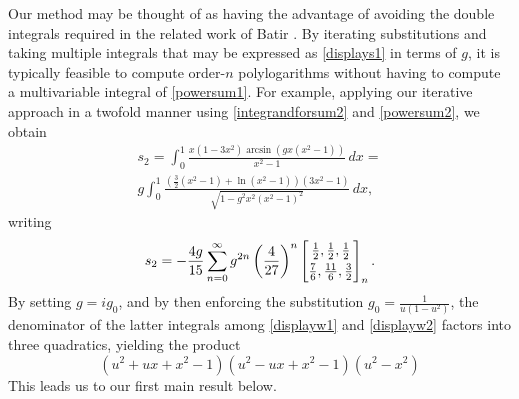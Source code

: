 \documentclass[12pt]{article}
\begin{document}
 Our method may be thought of as having the advantage of avoiding the double integrals required in the related work of Batir 
 \cite{Batir2005}. By iterating substitutions and taking multiple integrals that may be expressed as \eqref{displays1} in terms of 
 $g$, it is typically feasible to compute order-$n$ polylogarithms without having to compute a multivariable integral of 
 \eqref{powersum1}. For example, applying our iterative approach in a twofold manner using \eqref{integrandforsum2} and 
 \eqref{powersum2}, we obtain 
\begin{multline*}
 s_2 = \int_0^1 \frac{x(1 - 3x^2) \arcsin \left( g x (x^2 - 1) \right)}{x^2 - 1} \, dx = \\ 
 g\int_0^1 \frac{\left( \frac{3}{2}(x^2 - 1) + \ln(x^2 - 1) \right) (3x^2 - 1)}{\sqrt{1 - g^2 x^2 (x^2 - 1)^2}} \, dx, 
\end{multline*}
 writing 
\begin{equation*}
 s_2 = -\frac{4g}{15} \sum_{n=0}^{\infty} g^{2n} \left( \frac{4}{27} \right)^{n} 
 \left[ \begin{matrix} \frac{1}{2}, \frac{1}{2}, \frac{1}{2} 
 \vspace{1mm} \\ 
 \frac{7}{6}, \frac{11}{6}, \frac{3}{2} \end{matrix} \right]_{n}. 
\end{equation*}
 By setting $g = ig_0$, and by then enforcing the substitution $g_0 = \frac{1}{u(1-u^2)}$, the 
 denominator of the latter integrals 
 among \eqref{displayw1} and \eqref{displayw2} factors into three quadratics, yielding the product 
\begin{equation}\label{productforpartial}
 (u^2+ux+x^2-1)(u^2-ux+x^2-1)(u^2-x^2) 
\end{equation}
 This leads us to our first main result below. 
\end{document}
